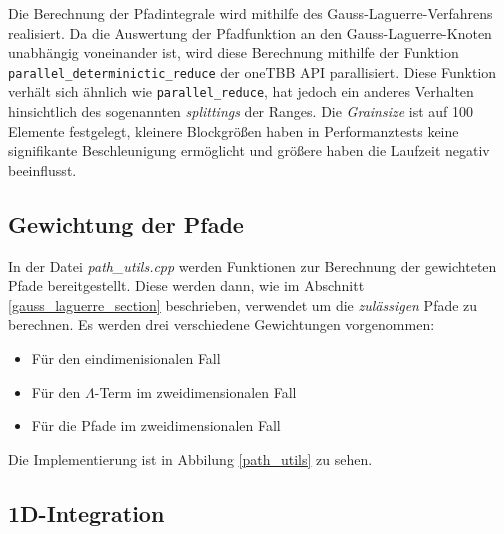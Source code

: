 Die Berechnung der Pfadintegrale wird mithilfe des Gauss-Laguerre-Verfahrens realisiert.
Da die Auswertung der Pfadfunktion an den Gauss-Laguerre-Knoten unabhängig voneinander ist,
 wird diese Berechnung mithilfe der Funktion \linebreak \texttt{parallel\_determinictic\_reduce} der oneTBB API parallisiert.
Diese Funktion verhält sich ähnlich wie \texttt{parallel\_reduce}, hat jedoch ein anderes Verhalten hinsichtlich des sogenannten \textit{splittings} der Ranges. 
Die \textit{Grainsize} ist auf 100 Elemente festgelegt, kleinere Blockgrößen haben in Performanztests keine signifikante Beschleunigung ermöglicht und größere haben die Laufzeit negativ beeinflusst.

\begin{center}
    
    \label{gauss_laguerre_impl}
\end{center}

\subsection{Gewichtung der Pfade}

In der Datei \textit{path\_utils.cpp} werden Funktionen zur Berechnung der gewichteten Pfade bereitgestellt.
Diese werden dann, wie im Abschnitt \ref{gauss_laguerre_section} beschrieben, verwendet um die \textit{zulässigen} Pfade zu berechnen.
Es werden drei verschiedene Gewichtungen vorgenommen:
\begin{itemize}
    \item Für den eindimenisionalen Fall
    \item Für den $\Lambda$-Term im zweidimensionalen Fall
    \item Für die Pfade im zweidimensionalen Fall
\end{itemize}

Die Implementierung ist in Abbilung \ref{path_utils} zu sehen.

\begin{center}
    
    \label{path_utils}
\end{center}

\subsection{1D-Integration}

